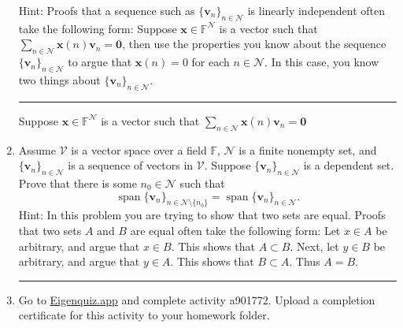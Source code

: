 \documentclass[12pt]{amsart}
\newcommand{\1}{\mathbbm{1}}
\numberwithin{equation}{section}
\numberwithin{Theorem}{section}
\theoremstyle{plain} %
\theoremstyle{definition}
\theoremstyle{remark}
\begin{document}
\begin{enumerate}[1.]
Hint: Proofs that a sequence such as \(\{\mathbf{v}_{n}\}_{n\in\mathcal{N}}\) is linearly independent often take the following form: Suppose \(\mathbf{x}\in\mathbb{F}^{\mathcal{N}}\) is a vector such that \(\sum_{n\in\mathcal{N}}\mathbf{x}(n)\mathbf{v}_{n} = \mathbf{0}\), then use the properties you know about the sequence \(\{\mathbf{v}_{n}\}_{n\in\mathcal{N}}\) to argue that \(\mathbf{x}(n) = 0\) for each \(n\in\mathcal{N}\). In this case, you know two things about \(\{\mathbf{v}_{n}\}_{n\in\mathcal{N}}\).
\\
\hrule
\bigskip

Suppose \(\mathbf{x}\in\mathbb{F}^{\mathcal{N}}\) is a vector such that \(\sum_{n\in\mathcal{N}}\mathbf{x}(n)\mathbf{v}_{n} = \mathbf{0}\)



\newpage

\item Assume \(\mathcal{V}\) is a vector space over a field \(\mathbb{F}\), \(\mathcal{N}\) is a finite nonempty set, and \(\{\mathbf{v}_{n}\}_{n\in\mathcal{N}}\) is a sequence of vectors in \(\mathcal{V}\). Suppose \(\{\mathbf{v}_{n}\}_{n\in\mathcal{N}}\) is a dependent set.  Prove that there is some \(n_{0}\in\mathcal{N}\) such that
\[\operatorname{span}\{\mathbf{v}_{n}\}_{n\in\mathcal{N}\setminus\{n_{0}\}} = \operatorname{span}\{\mathbf{v}_{n}\}_{n\in\mathcal{N}}.\]
Hint: In this problem you are trying to show that two sets are equal. Proofs that two sets \(A\) and \(B\) are equal often take the following form: Let \(x\in A\) be arbitrary, and argue that \(x\in B\). This shows that \(A\subset B\). Next, let \(y\in B\) be arbitrary, and argue that \(y\in A\). This shows that \(B\subset A\). Thus \(A=B\). \\
\hrule
\bigskip


\vspace*{\fill}
\item Go to \href{https://eigenquiz.app/}{Eigenquiz.app} and complete activity a901772. Upload a completion certificate for this activity to your homework folder.
\end{enumerate}
\end{document}
